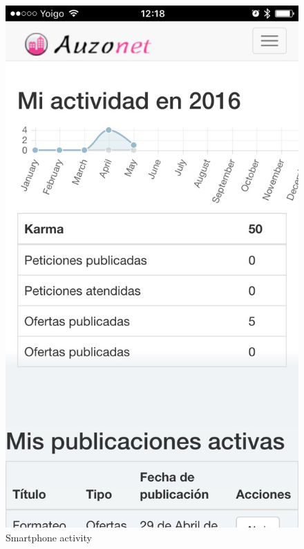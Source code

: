 \documentclass{DeustoFDP}
\begin{document}
\begin{figure}[h!]
\centering
\includegraphics[width=0.7\linewidth]{fig/Manual/mobileprofile}
\caption[Smartphone activity]{Smartphone activity}
\label{fig:mobileprofile}
\end{figure}
\end{document}

